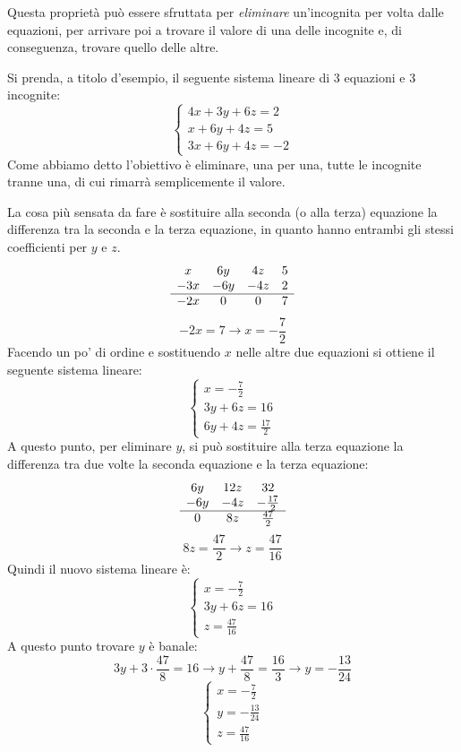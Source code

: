 Questa proprietà può essere sfruttata per \textit{eliminare} un'incognita per volta dalle equazioni, per arrivare poi a trovare il valore di una delle incognite e, di conseguenza, trovare quello delle altre.

Si prenda, a titolo d'esempio, il seguente sistema lineare di 3 equazioni e 3 incognite:
\[
    \begin{cases}
        4x + 3y + 6z = 2 \\
        x + 6y + 4z = 5 \\
        3x + 6y + 4z = -2
    \end{cases}
\]
Come abbiamo detto l'obiettivo è eliminare, una per una, tutte le incognite tranne una, di cui rimarrà semplicemente il valore.

La cosa più sensata da fare è sostituire alla seconda (o alla terza) equazione la differenza tra la seconda e la terza equazione, in quanto hanno entrambi gli stessi coefficienti per $y$ e $z$.
\[
    \begin{array}{c c c c}
        x & 6y & 4z & 5 \\
        -3x & -6y & -4z & 2 \\
        \hline
        -2x & 0 & 0 & 7
    \end{array}
\]
\[
    -2x = 7 \rightarrow x = -\frac{7}{2}
\]
Facendo un po' di ordine e sostituendo $x$ nelle altre due equazioni si ottiene il seguente sistema lineare:
\[
    \begin{cases}
        x = -\frac{7}{2} \\
        3y + 6z = 16 \\
        6y + 4z = \frac{17}{2}
    \end{cases}
\]
A questo punto, per eliminare $y$, si può sostituire alla terza equazione la differenza tra due volte la seconda equazione e la terza equazione:
\[
    \begin{array}{c c c}
        6y & 12z &32 \\
        -6y & -4z & -\frac{17}{2} \\
        \hline
        0 & 8z & \frac{47}{2}
    \end{array}
\]
\[
    8z = \frac{47}{2} \rightarrow z = \frac{47}{16}
\]
Quindi il nuovo sistema lineare è:
\[
    \begin{cases}
        x = -\frac{7}{2} \\
        3y + 6z = 16 \\
        z = \frac{47}{16}
    \end{cases}
\]
A questo punto trovare $y$ è banale:
\[
    3y + 3 \cdot \frac{47}{8} = 16 \rightarrow y + \frac{47}{8} = \frac{16}{3} \rightarrow y = -\frac{13}{24}
\]
\[
    \begin{cases}
        x = -\frac{7}{2} \\
        y = -\frac{13}{24} \\
        z = \frac{47}{16}
    \end{cases}
\]

